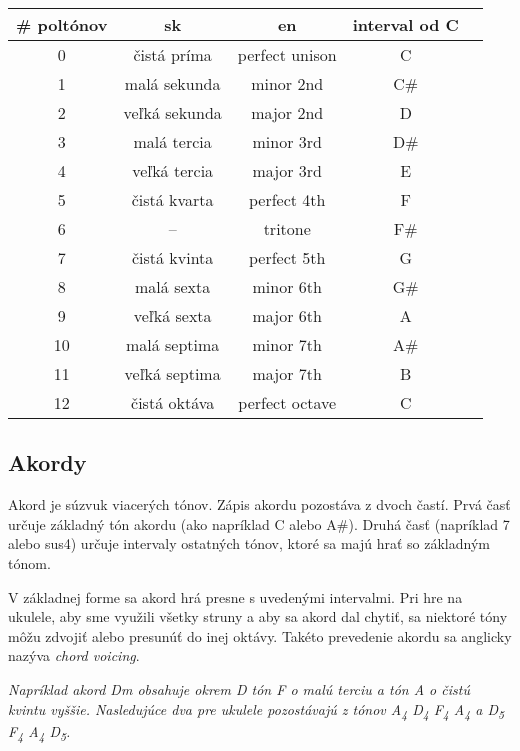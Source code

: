 \begin{center}
\begin{tabular}{ c c c c c }
    \# poltónov & sk & en & interval od C \\
    \hline
    0 & čistá príma & perfect unison & C \\
    1 & malá sekunda & minor 2nd & C\# \\
    2 & veľká sekunda & major 2nd & D \\
    3 & malá tercia & minor 3rd & D\# \\
    4 & veľká tercia & major 3rd & E \\
    5 & čistá kvarta & perfect 4th & F \\
    6 & -- & tritone & F\# \\
    7 & čistá kvinta & perfect 5th & G \\
    8 & malá sexta & minor 6th & G\# \\
    9 & veľká sexta & major 6th & A \\
    10 & malá septima & minor 7th & A\# \\
    11 & veľká septima & major 7th & B \\
    12 & čistá oktáva & perfect octave & C \\
\end{tabular}
\end{center}


\subsection*{Akordy}

Akord je súzvuk viacerých tónov. Zápis akordu pozostáva z dvoch častí. Prvá časť
určuje základný tón akordu (ako napríklad C alebo A\#). Druhá časť (napríklad 7 alebo sus4)
určuje intervaly ostatných tónov, ktoré sa majú hrať so základným tónom.

V základnej forme sa akord hrá presne s uvedenými intervalmi. Pri hre na ukulele, aby sme využili
všetky struny a aby sa akord dal chytiť, sa niektoré tóny môžu zdvojiť alebo presunúť do inej
oktávy. Takéto prevedenie akordu sa anglicky nazýva \textit{chord voicing}.

\textit{%
Napríklad akord Dm obsahuje okrem D tón F o malú terciu a tón A o čistú kvintu vyššie. Nasledujúce
dva  pre ukulele pozostávajú z tónov A\textsubscript{4} D\textsubscript{4} F\textsubscript{4} A\textsubscript{4}
a D\textsubscript{5} F\textsubscript{4} A\textsubscript{4} D\textsubscript{5}.
}

\begin{center}
 \quad {}
\end{center}

